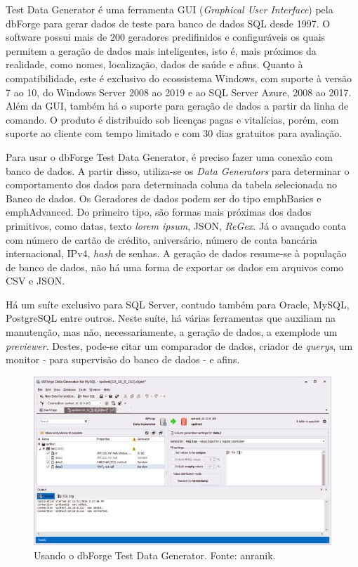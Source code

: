 \documentclass[
	12pt,				%
	openright,			%
	twoside,			%
	a4paper,			%
	english,			%
	brazil				%
	]{abntex2}
\begin{document}
		Test Data Generator \cite{forgeDBDataGenerator} é uma ferramenta GUI (\emph{Graphical User Interface}) pela dbForge para gerar dados de teste para banco de dados SQL desde 1997.
		O software possui mais de 200 geradores predifinidos e configuráveis os quais permitem a geração de dados mais inteligentes, isto é, mais próximos da realidade, como nomes, localização, dados de saúde e afins.
		Quanto à compatibilidade, este é exclusivo do ecossistema Windows, com suporte à versão 7 ao 10, do Windows Server 2008 ao 2019 e ao SQL Server Azure, 2008 ao 2017.
		Além da GUI, também há o suporte para geração de dados a partir da linha de comando.
		O produto é distribuido sob licenças pagas e vitalícias, porém, com suporte ao cliente com tempo limitado e com 30 dias gratuitos para avaliação.
		\par
		Para usar o dbForge Test Data Generator, é preciso fazer uma conexão com banco de dados. 
		A partir disso, utiliza-se os \emph{Data Generators} para determinar o comportamento dos dados para determinada coluna da tabela selecionada no Banco de dados.
		Os Geradores de dados podem ser do tipo emph{Basics} e emph{Advanced}. 
		Do primeiro tipo, são formas mais próximas dos dados primitivos, como datas, texto \emph{lorem ipsum}, JSON, \emph{ReGex}.
		Já o avançado conta com número de cartão de crédito, aniversário, número de conta bancária internacional, IPv4, \emph{hash} de senhas.  
		A geração de dados resume-se à população de banco de dados, não há uma forma de exportar os dados em arquivos como CSV e JSON.
		\par
		Há um suíte exclusivo para SQL Server, contudo também para Oracle, MySQL, PostgreSQL entre outros.
		Neste suíte, há várias ferramentas que auxiliam na manutenção, mas não, necessariamente, a geração de dados, a exemplode um \emph{previewer}.
		Destes, pode-se citar um comparador de dados, criador de \emph{querys}, um monitor - para supervisão do banco de dados - e afins.
		\begin{figure}[h]
			\centering
			\includegraphics[width=\linewidth]{./figures/TrabalhosRelacionados/dbForge-Test-Data-Generator.jpg}
			\caption{Usando o dbForge Test Data Generator. Fonte: anranik.}
			\label{fig:dbForgeTDG}
		\end{figure}
\end{document}
